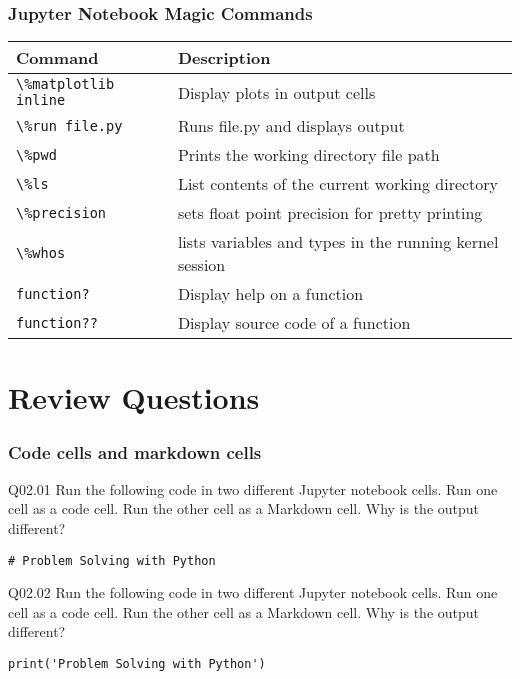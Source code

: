 \documentclass{book}
\newenvironment{problems}{}{}  %
\newcommand{\passthrough}[1]{#1}
\begin{document}
    
        \hypertarget{jupyter-notebook-magic-commands}{%
\subsubsection{Jupyter Notebook Magic
Commands}\label{jupyter-notebook-magic-commands}}

\begin{longtable}[]{@{}ll@{}}
\toprule
Command & Description\tabularnewline
\midrule
\endhead
\passthrough{\lstinline!\%matplotlib inline!} & Display plots in output
cells\tabularnewline
\passthrough{\lstinline!\%run file.py!} & Runs file.py and displays
output\tabularnewline
\passthrough{\lstinline!\%pwd!} & Prints the working directory file
path\tabularnewline
\passthrough{\lstinline!\%ls!} & List contents of the current working
directory\tabularnewline
\passthrough{\lstinline!\%precision!} & sets float point precision for
pretty printing\tabularnewline
\passthrough{\lstinline!\%whos!} & lists variables and types in the
running kernel session\tabularnewline
\passthrough{\lstinline!function?!} & Display help on a
function\tabularnewline
\passthrough{\lstinline!function??!} & Display source code of a
function\tabularnewline
\bottomrule
\end{longtable}
    




    
        \hypertarget{review-questions}{%
\section{Review Questions}\label{review-questions}}
    




    
        \begin{problems}
        \hypertarget{code-cells-and-markdown-cells}{%
\subsubsection{Code cells and markdown
cells}\label{code-cells-and-markdown-cells}}

Q02.01 Run the following code in two different Jupyter notebook cells.
Run one cell as a code cell. Run the other cell as a Markdown cell. Why
is the output different?

\begin{lstlisting}
# Problem Solving with Python
\end{lstlisting}

Q02.02 Run the following code in two different Jupyter notebook cells.
Run one cell as a code cell. Run the other cell as a Markdown cell. Why
is the output different?

\begin{lstlisting}
print('Problem Solving with Python')
\end{lstlisting}
        \end{problems}
\end{document}
